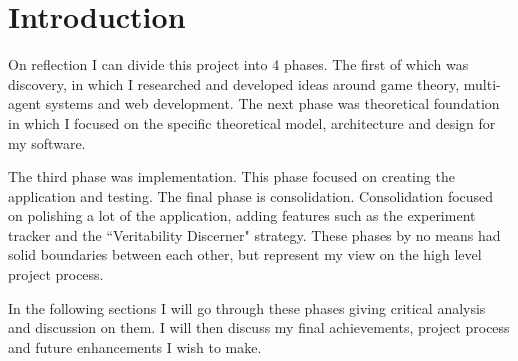 \documentclass[]{final_report}
\begin{document}
\section{Introduction}
On reflection I can divide this project into 4 phases. The first of which was discovery, in which I researched and developed ideas around game theory, multi-agent systems and web development. The next phase was theoretical foundation in which I focused on the specific theoretical model, architecture and design for my software.\par 
The third phase was implementation. This phase focused on creating the application and testing. The final phase is consolidation. Consolidation focused on polishing a lot of the application, adding features such as the experiment tracker and the ``Veritability Discerner" strategy. These phases by no means had solid boundaries between each other, but represent my view on the high level project process.\par 
In the following sections I will go through these phases giving critical analysis and discussion on them. I will then discuss my final achievements, project process and future enhancements I wish to make.
\end{document}
